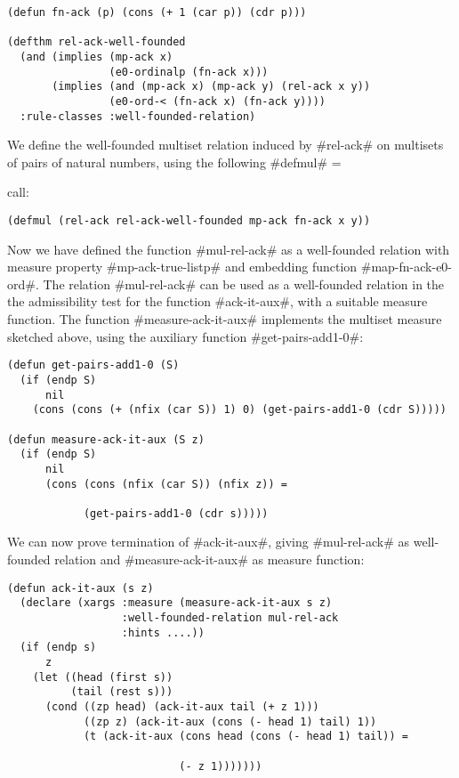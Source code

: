 \documentclass[11pt]{llncs}
\begin{document}
{\begin{verbatim}
(defun fn-ack (p) (cons (+ 1 (car p)) (cdr p)))

(defthm rel-ack-well-founded
  (and (implies (mp-ack x)
                (e0-ordinalp (fn-ack x)))
       (implies (and (mp-ack x) (mp-ack y) (rel-ack x y))
                (e0-ord-< (fn-ack x) (fn-ack y))))
  :rule-classes :well-founded-relation)
\end{verbatim}

We define the well-founded multiset relation induced by #rel-ack# on
multisets of pairs of natural numbers, using the following #defmul# =

call:

\begin{verbatim}
(defmul (rel-ack rel-ack-well-founded mp-ack fn-ack x y))
\end{verbatim}

Now we have defined the function #mul-rel-ack# as a well-founded
relation with measure property #mp-ack-true-listp# and embedding
function #map-fn-ack-e0-ord#. The relation #mul-rel-ack# can be used as
a well-founded relation in the the admissibility test for the function
#ack-it-aux#, with a suitable measure function. The function
#measure-ack-it-aux# implements the multiset measure sketched above,
using the auxiliary function #get-pairs-add1-0#:

\begin{verbatim}
(defun get-pairs-add1-0 (S)
  (if (endp S)
      nil
    (cons (cons (+ (nfix (car S)) 1) 0) (get-pairs-add1-0 (cdr S)))))

(defun measure-ack-it-aux (S z)
  (if (endp S)
      nil
      (cons (cons (nfix (car S)) (nfix z)) =

            (get-pairs-add1-0 (cdr s)))))
\end{verbatim}

We can now prove termination of #ack-it-aux#, giving #mul-rel-ack# as
well\--foun\-ded relation and #measure-ack-it-aux# as measure function:

\begin{verbatim}
(defun ack-it-aux (s z)
  (declare (xargs :measure (measure-ack-it-aux s z)
                  :well-founded-relation mul-rel-ack
                  :hints ....))
  (if (endp s)
      z
    (let ((head (first s))
          (tail (rest s)))
      (cond ((zp head) (ack-it-aux tail (+ z 1)))
            ((zp z) (ack-it-aux (cons (- head 1) tail) 1))
            (t (ack-it-aux (cons head (cons (- head 1) tail)) =

                           (- z 1)))))))
\end{verbatim}

}
\end{document}
